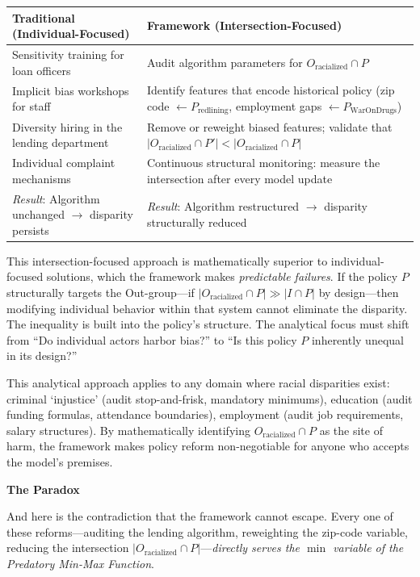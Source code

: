\documentclass[12pt,openany]{book}
\begin{document}
\medskip
\noindent
\begin{tabular}{@{}p{}|p{}@{}}
\textbf{Traditional (Individual-Focused)} & \textbf{Framework (Intersection-Focused)} \\
\hline
Sensitivity training for loan officers & Audit algorithm parameters for $O_{\text{racialized}} \cap P$ \\[4pt]
Implicit bias workshops for staff & Identify features that encode historical policy (zip code $\leftarrow P_{\text{redlining}}$, employment gaps $\leftarrow P_{\text{WarOnDrugs}}$) \\[4pt]
Diversity hiring in the lending department & Remove or reweight biased features; validate that $|O_{\text{racialized}} \cap P'| < |O_{\text{racialized}} \cap P|$ \\[4pt]
Individual complaint mechanisms & Continuous structural monitoring: measure the intersection after every model update \\[4pt]
\textit{Result}: Algorithm unchanged $\rightarrow$ disparity persists & \textit{Result}: Algorithm restructured $\rightarrow$ disparity structurally reduced \\
\end{tabular}

\medskip
This intersection-focused approach is mathematically superior to individual-focused solutions, which the framework makes \textit{predictable failures}. If the policy $P$ structurally targets the Out-group---if $|O_{\text{racialized}} \cap P| \gg |I \cap P|$ by design---then modifying individual behavior within that system cannot eliminate the disparity. The inequality is built into the policy's structure. The analytical focus must shift from ``Do individual actors harbor bias?'' to ``Is this policy $P$ inherently unequal in its design?''

This analytical approach applies to any domain where racial disparities exist: criminal `injustice' (audit stop-and-frisk, mandatory minimums), education (audit funding formulas, attendance boundaries), employment (audit job requirements, salary structures). By mathematically identifying $O_{\text{racialized}} \cap P$ as the site of harm, the framework makes policy reform non-negotiable for anyone who accepts the model's premises.

\medskip
\textbf{The Paradox}

\medskip
And here is the contradiction that the framework cannot escape. Every one of these reforms---auditing the lending algorithm, reweighting the zip-code variable, reducing the intersection $|O_{\text{racialized}} \cap P|$---\textit{directly serves the $\min$ variable of the Predatory Min-Max Function}.
\end{document}
